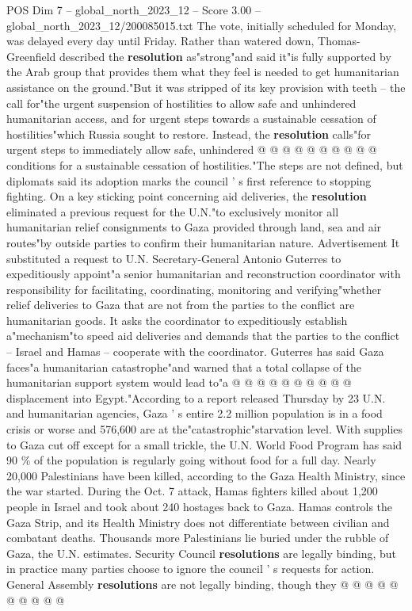\begin{textsample}{POS Dim 7 – global\_north\_2023\_12 – Score 3.00 – global\_north\_2023\_12/200085015.txt}
The vote, initially scheduled for Monday, was delayed every day until Friday.
Rather than watered down, Thomas-Greenfield described the \textbf{resolution} as"strong"and said it"is fully supported by the Arab group that provides them what they feel is needed to get humanitarian assistance on the ground."But it was stripped of its key provision with teeth -- the call for"the urgent suspension of hostilities to allow safe and unhindered humanitarian access, and for urgent steps towards a sustainable cessation of hostilities"which Russia sought to restore.
Instead, the \textbf{resolution} calls"for urgent steps to immediately allow safe, unhindered @ @ @ @ @ @ @ @ @ @ conditions for a sustainable cessation of hostilities."The steps are not defined, but diplomats said its adoption marks the council ' s first reference to stopping fighting.
On a key sticking point concerning aid deliveries, the \textbf{resolution} eliminated a previous request for the U.N."to exclusively monitor all humanitarian relief consignments to Gaza provided through land, sea and air routes"by outside parties to confirm their humanitarian nature.
Advertisement It substituted a request to U.N.
Secretary-General Antonio Guterres to expeditiously appoint"a senior humanitarian and reconstruction coordinator with responsibility for facilitating, coordinating, monitoring and verifying"whether relief deliveries to Gaza that are not from the parties to the conflict are humanitarian goods.
It asks the coordinator to expeditiously establish a"mechanism"to speed aid deliveries and demands that the parties to the conflict -- Israel and Hamas -- cooperate with the coordinator.
Guterres has said Gaza faces"a humanitarian catastrophe"and warned that a total collapse of the humanitarian support system would lead to"a @ @ @ @ @ @ @ @ @ @ displacement into Egypt."According to a report released Thursday by 23 U.N. and humanitarian agencies, Gaza ' s entire 2.2 million population is in a food crisis or worse and 576,600 are at the"catastrophic"starvation level.
With supplies to Gaza cut off except for a small trickle, the U.N.
World Food Program has said 90 \% of the population is regularly going without food for a full day.
Nearly 20,000 Palestinians have been killed, according to the Gaza Health Ministry, since the war started.
During the Oct. 7 attack, Hamas fighters killed about 1,200 people in Israel and took about 240 hostages back to Gaza.
Hamas controls the Gaza Strip, and its Health Ministry does not differentiate between civilian and combatant deaths.
Thousands more Palestinians lie buried under the rubble of Gaza, the U.N. estimates.
Security Council \textbf{resolutions} are legally binding, but in practice many parties choose to ignore the council ' s requests for action.
General Assembly \textbf{resolutions} are not legally binding, though they @ @ @ @ @ @ @ @ @ @

\end{textsample}

